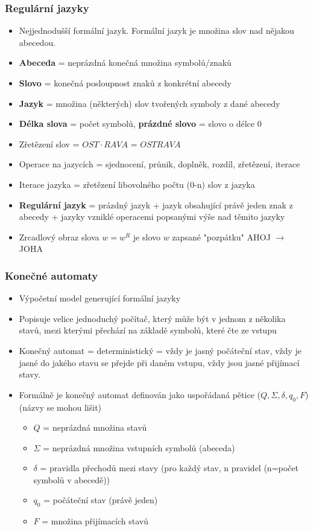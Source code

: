\documentclass[10pt,a4paper]{article}
\begin{document}
\subsubsection{Regulární jazyky}
\begin{itemize}
\item Nejjednodušší formální jazyk. Formální jazyk je množina slov nad nějakou abecedou.
\item \textbf{Abeceda} = neprázdná konečná množina symbolů/znaků
\item \textbf{Slovo} = konečná posloupnost znaků z konkrétní abecedy
\item \textbf{Jazyk} = množina (některých) slov tvořených symboly z dané abecedy
\item \textbf{Délka slova} = počet symbolů, \textbf{prázdné slovo} = slovo o délce 0
\item Zřetězení slov = $OST \cdot RAVA$ = $OSTRAVA$
\item Operace na jazycích = sjednocení, průnik, doplněk, rozdíl, zřetězení, iterace
\item Iterace jazyka = zřetězení libovolného počtu (0-n) slov z jazyka
\item \textbf{Regulární jazyk} = prázdný jazyk + jazyk obsahující právě jeden znak z abecedy + jazyky vzniklé operacemi popsanými výše nad těmito jazyky
\item Zrcadlový obraz slova $w = w^R$ je slovo $w$ zapsané "pozpátku" AHOJ $\rightarrow$ JOHA
\end{itemize}

\subsubsection{Konečné automaty}
\begin{itemize}
\item Výpočetní model generující formální jazyky
\item Popisuje velice jednoduchý počítač, který může být v jednom z několika stavů, mezi kterými přechází na základě symbolů, které čte ze vstupu
\item Konečný automat = deterministický = vždy je jasný počáteční stav, vždy je jasné do jakého stavu se přejde při daném vstupu, vždy jsou jasné přijímací stavy.
\item Formálně je konečný automat definován jako uspořádaná pětice ($Q, \Sigma, \delta, q_0, F$) (názvy se mohou lišit)
\begin{itemize}
\item $Q$ = neprázdná množina stavů
\item $\Sigma$ = neprázdná množina vstupních symbolů (abeceda)
\item $\delta$ = pravidla přechodů mezi stavy (pro každý stav, n pravidel (n=počet symbolů v abecedě))
\item $q_0$ = počáteční stav (právě jeden)
\item $F$ = množina přijímacích stavů
\end{itemize}
\end{itemize}
\end{document}

